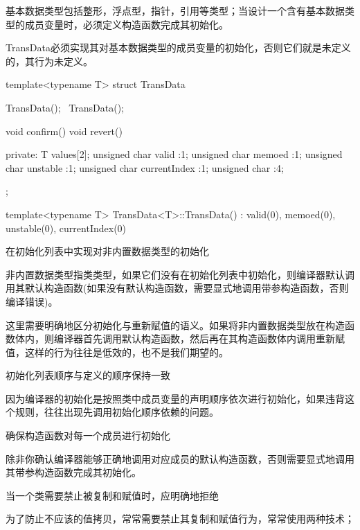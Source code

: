 \begin{content}
基本数据类型包括整形，浮点型，指针，引用等类型；当设计一个含有基本数据类型的成员变量时，必须定义构造函数完成其初始化。

TransData必须实现其对基本数据类型的成员变量的初始化，否则它们就是未定义的，其行为未定义。

\begin{leftbar}
\begin{c++}
template<typename T>
struct TransData
{
   TransData();
   ~TransData();

   void confirm()
   void revert()

private:
   T values[2];
   unsigned char valid :1;
   unsigned char memoed :1;
   unsigned char unstable :1;
   unsigned char currentIndex :1;
   unsigned char :4;
};

template<typename T>
TransData<T>::TransData() : valid(0), memoed(0), unstable(0), currentIndex(0)
{
}
\end{c++}
\end{leftbar}

\begin{regulation}
在初始化列表中实现对非内置数据类型的初始化
\end{regulation}

非内置数据类型指类类型，如果它们没有在初始化列表中初始化，则编译器默认调用其默认构造函数(如果没有默认构造函数，需要显式地调用带参构造函数，否则编译错误)。

这里需要明确地区分初始化与重新赋值的语义。如果将非内置数据类型放在构造函数体内，则编译器首先调用默认构造函数，然后再在其构造函数体内调用重新赋值，这样的行为往往是低效的，也不是我们期望的。

\begin{regulation}
初始化列表顺序与定义的顺序保持一致
\end{regulation}

因为编译器的初始化是按照类中成员变量的声明顺序依次进行初始化，如果违背这个规则，往往出现先调用初始化顺序依赖的问题。

\begin{regulation}
确保构造函数对每一个成员进行初始化
\end{regulation}

除非你确认编译器能够正确地调用对应成员的默认构造函数，否则需要显式地调用其带参构造函数完成其初始化。

\begin{regulation}
当一个类需要禁止被复制和赋值时，应明确地拒绝
\end{regulation}

为了防止不应该的值拷贝，常常需要禁止其复制和赋值行为，常常使用两种技术；


\end{content}
